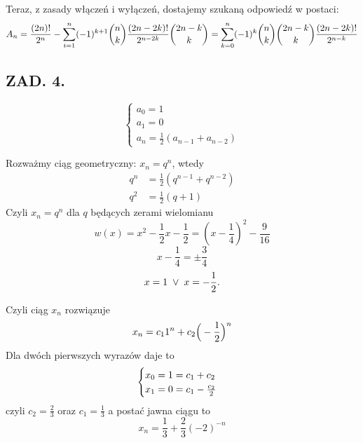 \documentclass{article}[13pt]
\begin{document}
Teraz, z zasady włączeń i wyłączeń, dostajemy szukaną odpowiedź w postaci:
$$A_{n}={(2n)!\over 2^n}-\sum\limits_{i=1}^n(-1)^{k+1}{n\choose k}{(2n-2k)!\over 2^{n-2k}}{2n-k\choose k}=\sum\limits_{k=0}^n(-1)^k{n\choose k}{2n-k\choose k}{(2n-2k)!\over 2^{n-k}}$$


\subsection*{ZAD. 4.}

$$\begin{cases}
    a_0=1\\
    a_1=0\\
    a_n=\frac12(a_{n-1}+a_{n-2})
\end{cases}$$

Rozważmy ciąg geometryczny: $x_n=q^n$, wtedy
\begin{align*}
    q^n&=\frac12(q^{n-1}+q^{n-2})\\
    q^2&=\frac12(q+1)
\end{align*}
Czyli $x_n=q^n$ dla $q$ będących zerami wielomianu
$$w(x)=x^2-\frac12x-\frac12=(x-\frac14)^2-\frac9{16}$$
$$x-\frac14=\pm \frac34$$
$$x=1\;\lor\;x=-{1\over 2}.$$

Czyli ciąg $x_n$ rozwiązuje
$$x_n=c_11^n+c_2\Big(-{1\over 2}\Big)^n$$
Dla dwóch pierwszych wyrazów daje to
\begin{align*}
    \begin{cases}
        x_0=1=c_1+c_2\\
        x_1=0=c_1-{c_2\over2}
    \end{cases}\\
\end{align*}
czyli $c_2=\frac23$ oraz $c_1=\frac13$ a postać jawna ciągu to
$$x_n=\frac13+\frac23(-2)^{-n}$$








\end{document}
